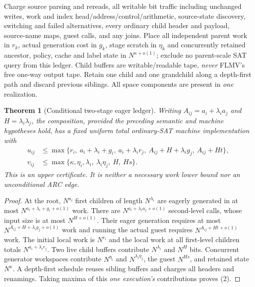 \documentclass[11pt]{article}
\newtheorem{theorem}{Theorem}
\begin{document}
Charge source parsing and rereads, all writable bit traffic including
unchanged writes, work and index head/address/control/arithmetic,
source-state discovery, switching and failed alternatives, every ordinary
child header and payload, source-name maps, guest calls, and any joins.
Place all independent parent work in $r_k$, actual generation cost in
$g_k$, stage scratch in $\eta_k$ and concurrently retained ancestor,
policy, cache and label state in $N^{\kappa+o(1)}$; exclude no parent-scale
SAT query from this ledger. Child buffers are writable/readable tape,
\emph{never} FLMV's free one-way output tape. Retain one child and one
grandchild along a depth-first path and discard previous siblings. All
space components are present in \emph{one} realization.

\begin{theorem}[Conditional two-stage eager ledger]\label{th:ledger}
Writing $A_{ij}=a_i+\lambda_i a_j$ and $H=\lambda_i\lambda_j$, the
composition, \emph{provided the preceding semantic and machine hypotheses
hold}, has a fixed uniform total ordinary-SAT machine implementation with
\[
\boxed{\begin{aligned}
 u_{ij}&\le\max\{r_i,\ a_i+\lambda_i+g_i,\
                a_i+\lambda_i r_j,\ A_{ij}+H+\lambda_i g_j,\
                A_{ij}+Ht\},\\
 v_{ij}&\le\max\{\kappa,\eta_i,\lambda_i,\
                \lambda_i\eta_j,\ H,\ Hs\}.
\end{aligned}}\tag{2}
\]
This is an \emph{upper certificate}. It is neither a necessary work lower
bound nor an unconditional ARC edge.
\end{theorem}
\begin{proof}
At the root, $N^{a_i}$ first children of length $N^{\lambda_i}$
are eagerly generated in at most $N^{a_i+\lambda_i+g_i+o(1)}$
work. There are $N^{a_i+\lambda_i a_j+o(1)}$ second-level calls,
whose input size is at most $N^{H+o(1)}$. Their eager generation requires
at most $N^{A_{ij}+H+\lambda_i g_j+o(1)}$ work and running the
actual guest requires $N^{A_{ij}+Ht+o(1)}$ work. The initial local
work is $N^{r_i}$ and the local work at all first-level children totals
$N^{a_i+\lambda_i r_j}$. Two live child buffers contribute
$N^{\lambda_i}$ and $N^H$ bits. Concurrent generator workspaces
contribute $N^{\eta_i}$ and $N^{\lambda_i\eta_j}$, the guest
$N^{Hs}$, and retained state $N^\kappa$. A depth-first schedule
reuses sibling buffers and charges all headers and renamings. Taking
maxima of this \emph{one execution's} contributions proves (2).
\end{proof}
\end{document}
